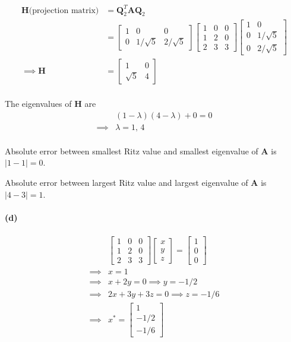 \documentclass[12pt, letterpaper]{article}
\begin{document}
\begin{align*}
  \mathbf{H}\text{(projection matrix)}  &= \mathbf{Q}_2^T\mathbf{A}\mathbf{Q}_2 \\
  &= \begin{bmatrix} 1 & 0 & 0 \\ 0 & 1/\sqrt{5} &2/\sqrt{5} \end{bmatrix}
  \begin{bmatrix} 1 & 0 & 0 \\ 1 & 2 & 0 \\ 2 & 3 & 3 \end{bmatrix}
  \begin{bmatrix} 1 & 0 \\ 0 & 1/\sqrt{5} \\ 0 & 2/\sqrt{5} \end{bmatrix} \\
  \implies \mathbf{H} &= \begin{bmatrix} 1 & 0 \\ \sqrt{5} & 4    \end{bmatrix} \\
\end{align*}

The eigenvalues of $\mathbf{H}$ are
\begin{align*}
  &(1 - \lambda)(4 - \lambda) + 0 = 0 \\
  \implies &\lambda = 1,\,4 \\
\end{align*}

Absolute error between smallest Ritz value and smallest eigenvalue of \textbf{A} is $|1 - 1| = 0$.

Absolute error between largest Ritz value and largest eigenvalue of \textbf{A} is $|4 - 3| = 1$.

\paragraph{(d)}
\begin{align*}
  &\begin{bmatrix} 1 & 0 & 0 \\ 1 & 2 & 0 \\ 2 & 3 & 3 \end{bmatrix}
  \begin{bmatrix} x  \\ y  \\ z  \end{bmatrix}
  = \begin{bmatrix} 1  \\ 0  \\ 0  \end{bmatrix} \\
  \implies &x = 1 \\
  \implies &x + 2y = 0 \implies y = -1/2 \\
  \implies &2x + 3y + 3z = 0 \implies z = -1/6 \\
  \implies & x^{*}= \begin{bmatrix} 1  \\ -1/2  \\ -1/6  \end{bmatrix} \\
\end{align*}
\end{document}
